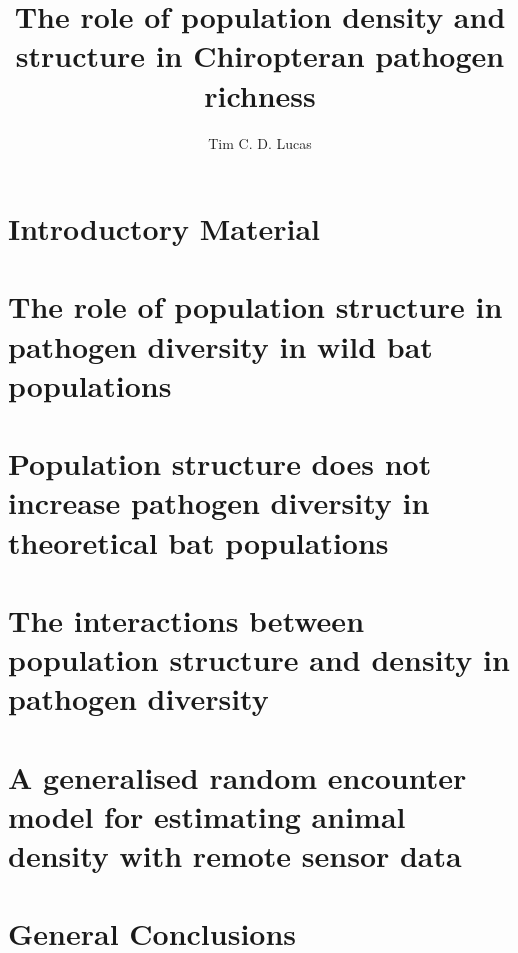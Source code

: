 \documentclass[11pt,phd,a4paper,oneside]{stanley}
\title{The role of population density and structure in Chiropteran pathogen richness}
\author{Tim C. D. Lucas}
\begin{document}



\chapter{Introductory Material}
\label{chapterlabel1}


\chapter{The role of population structure in pathogen diversity in wild bat populations}
\label{chapterlabel2}


\chapter{Population structure does not increase pathogen diversity in theoretical bat populations}
\label{chapterlabel3}


\chapter{The interactions between population structure and density in pathogen diversity}
\label{chapterlabel4}



\chapter[gREM for estimating animal density]{A generalised random encounter model for estimating animal density with remote sensor data}
\label{chapterlabel5}


\chapter{General Conclusions}
\label{chapterlabel4}




 


\printbibliography 

\end{document}
